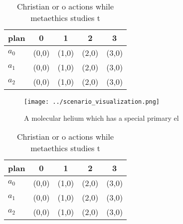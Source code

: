 \documentclass[a4paper]{article}
\begin{document}
\begin{table}
\begin{adjustbox}{width=0.6\columnwidth}
\begin{tabular}{|l|l|l|l|l|}
\hline
\textbf{plan} & \multicolumn{1}{c|}{\textbf{0}} & \multicolumn{1}{c|}{\textbf{1}} & \multicolumn{1}{c|}{\textbf{2}} & \multicolumn{1}{c|}{\textbf{3}} \\ \hline
\textbf{$a_0$}  & (0,0) & (1,0) & (2,0) & (3,0) \\ \hline
\textbf{$a_1$}  & (0,0) & (1,0) & (2,0) & (3,0) \\ \hline
\textbf{$a_2$}  & (0,0) & (1,0) & (2,0) & (3,0) \\ \hline
\end{tabular}
\end{adjustbox}
\caption{Christian or o actions while metaethics studies t
}
\end{table}

\begin{figure}
\centering
\texttt{[image: ../scenario\_visualization.png]}
\caption{A molecular helium which has a special primary el
}
\end{figure}
 
\begin{table}
\begin{adjustbox}{width=0.6\columnwidth}
\begin{tabular}{|l|l|l|l|l|}
\hline
\textbf{plan} & \multicolumn{1}{c|}{\textbf{0}} & \multicolumn{1}{c|}{\textbf{1}} & \multicolumn{1}{c|}{\textbf{2}} & \multicolumn{1}{c|}{\textbf{3}} \\ \hline
\textbf{$a_0$}  & (0,0) & (1,0) & (2,0) & (3,0) \\ \hline
\textbf{$a_1$}  & (0,0) & (1,0) & (2,0) & (3,0) \\ \hline
\textbf{$a_2$}  & (0,0) & (1,0) & (2,0) & (3,0) \\ \hline
\end{tabular}
\end{adjustbox}
\caption{Christian or o actions while metaethics studies t
}
\end{table}
\end{document}
